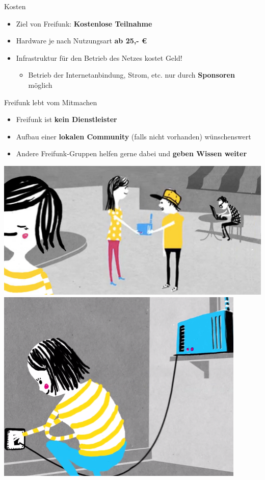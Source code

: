 \documentclass[t]{beamer}
\begin{document}
  \begin{frame}{Kosten}
    \begin{itemize}
      \item Ziel von Freifunk: \textbf{Kostenlose Teilnahme}
      \item Hardware je nach Nutzungsart \textbf{ab 25,- €}
      \item Infrastruktur für den Betrieb des Netzes kostet Geld!
      \begin{itemize}
        \item Betrieb der Internetanbindung, Strom, etc. nur durch \textbf{Sponsoren} möglich
      \end{itemize}
    \end{itemize}
  \end{frame}


  \begin{frame}{Freifunk lebt vom Mitmachen}
    \begin{itemize}
      \item Freifunk ist \textbf{kein Dienstleister}
      \item Aufbau einer \textbf{lokalen Community} (falls nicht vorhanden) wünschenswert
      \item Andere Freifunk-Gruppen helfen gerne dabei und \textbf{geben Wissen weiter}
    \end{itemize}
    \begin{center}
      \includegraphics[height=0.28\textheight]{images/router}
      \hspace{0.5em}
      \includegraphics[height=0.28\textheight]{images/setup}
    \end{center}
  \end{frame}
\end{document}
